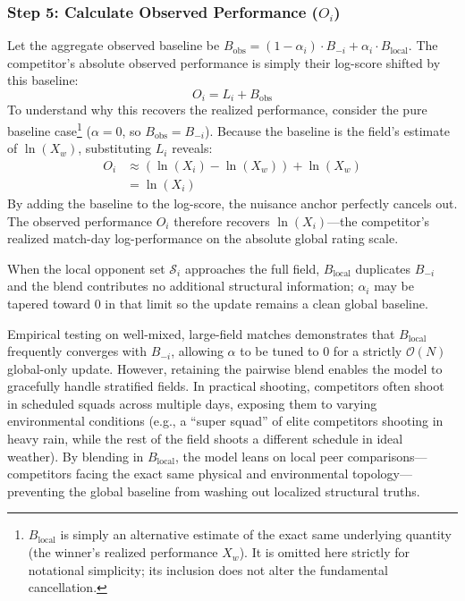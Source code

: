 \documentclass[12pt]{article}
\newcommand{\xwin}{X_w}
\newcommand{\blocal}{B_{\mathrm{local}}}
\newcommand{\bloo}{B_{-i}}
\begin{document}
	\subsubsection*{Step 5: Calculate Observed Performance ($O_i$)}
	Let the aggregate observed baseline be $B_{\mathrm{obs}} = (1 - \alpha_i) \cdot B_{-i} + \alpha_i \cdot B_{\mathrm{local}}$. The competitor's absolute observed performance is simply their log-score shifted by this baseline:
	\begin{equation}
		O_i = L_i + B_{\mathrm{obs}}
	\end{equation}
	To understand why this recovers the realized performance, consider the pure baseline case\footnote{\(\blocal\) is simply an alternative estimate of the exact same underlying quantity (the winner's realized performance $\xwin$). It is omitted here strictly for notational simplicity; its inclusion does not alter the fundamental cancellation.} ($\alpha = 0$, so $B_{\mathrm{obs}} = \bloo$). Because the baseline is the field's estimate of $\ln(\xwin)$, substituting $L_i$ reveals:
	\begin{align*}
		O_i &\approx (\ln(X_i) - \ln(\xwin)) + \ln(\xwin) \\
		&= \ln(X_i)
	\end{align*}
	By adding the baseline to the log-score, the nuisance anchor perfectly cancels out. The observed performance $O_i$ therefore recovers $\ln(X_i)$---the competitor's realized match-day log-performance on the absolute global rating scale.

	When the local opponent set $\mathcal{S}_i$ approaches the full field, $B_{\mathrm{local}}$ duplicates $B_{-i}$ and the blend contributes no additional structural information; $\alpha_i$ may be tapered toward 0 in that limit so the update remains a clean global baseline.

	Empirical testing on well-mixed, large-field matches demonstrates that $B_{\mathrm{local}}$ frequently converges with $B_{-i}$, allowing $\alpha$ to be tuned to 0 for a strictly $\mathcal{O}(N)$ global-only update. However, retaining the pairwise blend enables the model to gracefully handle stratified fields. In practical shooting, competitors often shoot in scheduled squads across multiple days, exposing them to varying environmental conditions (e.g., a ``super squad'' of elite competitors shooting in heavy rain, while the rest of the field shoots a different schedule in ideal weather). By blending in $B_{\mathrm{local}}$, the model leans on local peer comparisons---competitors facing the exact same physical and environmental topology---preventing the global baseline from washing out localized structural truths.
\end{document}
